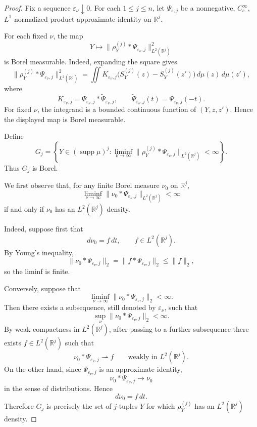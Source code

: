 \documentclass[11pt]{article}
\theoremstyle{remark}
\numberwithin{equation}{section}
\newcommand{\1}{\mathbf 1}
\begin{document}
\begin{proof}
Fix a sequence $\varepsilon_\nu\downarrow 0$. For each $1\le j\le n$,
let $\Psi_{\varepsilon,j}$ be a nonnegative, $C_c^\infty$,
$L^1$-normalized product approximate identity on $\mathbb R^j$.

For each fixed $\nu$, the map
\[
Y\longmapsto
\bigl\|
\rho_Y^{(j)}*\Psi_{\varepsilon_\nu,j}
\bigr\|_{L^2(\mathbb R^j)}^2
\]
is Borel measurable. Indeed, expanding the square gives
\[
\bigl\|
\rho_Y^{(j)}*\Psi_{\varepsilon_\nu,j}
\bigr\|_{L^2(\mathbb R^j)}^2
=
\iint
K_{\varepsilon_\nu,j}
\bigl(
S_Y^{(j)}(z)-S_Y^{(j)}(z')
\bigr)
\,d\mu(z)\,d\mu(z'),
\]
where
\[
K_{\varepsilon_\nu,j}
=
\Psi_{\varepsilon_\nu,j}
*
\widetilde{\Psi}_{\varepsilon_\nu,j},
\qquad
\widetilde{\Psi}_{\varepsilon_\nu,j}(t)
=
\Psi_{\varepsilon_\nu,j}(-t).
\]
For fixed $\nu$, the integrand is a bounded continuous function of
$(Y,z,z')$. Hence the displayed map is Borel measurable.

Define
\[
G_j
=
\left\{
Y\in(\operatorname{supp}\mu)^j:
\liminf_{\nu\to\infty}
\bigl\|
\rho_Y^{(j)}*\Psi_{\varepsilon_\nu,j}
\bigr\|_{L^2(\mathbb R^j)}
<\infty
\right\}.
\]
Thus $G_j$ is Borel.

We first observe that, for any finite Borel measure $\nu_0$ on
$\mathbb R^j$,
\[
\liminf_{\nu\to\infty}
\bigl\|
\nu_0*\Psi_{\varepsilon_\nu,j}
\bigr\|_{L^2(\mathbb R^j)}
<\infty
\]
if and only if $\nu_0$ has an $L^2(\mathbb R^j)$ density.

Indeed, suppose first that
\[
d\nu_0=f\,dt,
\qquad
f\in L^2(\mathbb R^j).
\]
By Young's inequality,
\[
\bigl\|
\nu_0*\Psi_{\varepsilon_\nu,j}
\bigr\|_2
=
\bigl\|
f*\Psi_{\varepsilon_\nu,j}
\bigr\|_2
\le
\|f\|_2,
\]
so the liminf is finite.

Conversely, suppose that
\[
\liminf_{\nu\to\infty}
\bigl\|
\nu_0*\Psi_{\varepsilon_\nu,j}
\bigr\|_2
<\infty.
\]
Then there exists a subsequence, still denoted by
$\varepsilon_\nu$, such that
\[
\sup_\nu
\bigl\|
\nu_0*\Psi_{\varepsilon_\nu,j}
\bigr\|_2
<\infty.
\]
By weak compactness in $L^2(\mathbb R^j)$, after passing to a further
subsequence there exists $f\in L^2(\mathbb R^j)$ such that
\[
\nu_0*\Psi_{\varepsilon_\nu,j}
\rightharpoonup f
\qquad
\text{weakly in }L^2(\mathbb R^j).
\]
On the other hand, since $\Psi_{\varepsilon_\nu,j}$ is an approximate
identity,
\[
\nu_0*\Psi_{\varepsilon_\nu,j}
\longrightarrow \nu_0
\]
in the sense of distributions. Hence
\[
d\nu_0=f\,dt.
\]
Therefore $G_j$ is precisely the set of $j$-tuples $Y$ for which
$\rho_Y^{(j)}$ has an $L^2(\mathbb R^j)$ density.


\end{proof}
\end{document}
